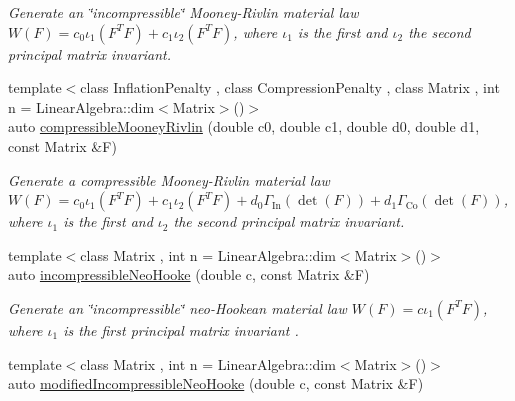 \begin{DoxyCompactItemize}
\begin{DoxyCompactList}\small\item\em Generate an \char`\"{}incompressible\char`\"{} Mooney-\/\-Rivlin material law $ W(F)=c_0\iota_1(F^T F) + c_1\iota_2(F^T F) $, where $\iota_1$ is the first and $\iota_2$ the second principal matrix invariant. \end{DoxyCompactList}\item 
\hypertarget{group__Rubber_ga9a1894daa10a0bdcc620c6c41ecb6f19}{{\footnotesize template$<$class Inflation\-Penalty , class Compression\-Penalty , class Matrix , int n = Linear\-Algebra\-::dim$<$\-Matrix$>$()$>$ }\\auto \hyperlink{group__Rubber_ga9a1894daa10a0bdcc620c6c41ecb6f19}{compressible\-Mooney\-Rivlin} (double c0, double c1, double d0, double d1, const Matrix \&F)}\label{group__Rubber_ga9a1894daa10a0bdcc620c6c41ecb6f19}

\begin{DoxyCompactList}\small\item\em Generate a compressible Mooney-\/\-Rivlin material law $ W(F)=c_0\iota_1(F^T F) + c_1\iota_2(F^T F) + d_0\Gamma_\mathrm{In}(\det(F))+d_1\Gamma_\mathrm{Co}(\det(F)) $, where $\iota_1$ is the first and $\iota_2$ the second principal matrix invariant. \end{DoxyCompactList}\item 
\hypertarget{group__Rubber_ga5bb28aef7006413775791998936d6b81}{{\footnotesize template$<$class Matrix , int n = Linear\-Algebra\-::dim$<$\-Matrix$>$()$>$ }\\auto \hyperlink{group__Rubber_ga5bb28aef7006413775791998936d6b81}{incompressible\-Neo\-Hooke} (double c, const Matrix \&F)}\label{group__Rubber_ga5bb28aef7006413775791998936d6b81}

\begin{DoxyCompactList}\small\item\em Generate an \char`\"{}incompressible\char`\"{} neo-\/\-Hookean material law $ W(F)=c\iota_1(F^T F) $, where $\iota_1$ is the first principal matrix invariant . \end{DoxyCompactList}\item 
\hypertarget{group__Rubber_gaf6f5ab6a379ef03d513acc5042731a01}{{\footnotesize template$<$class Matrix , int n = Linear\-Algebra\-::dim$<$\-Matrix$>$()$>$ }\\auto \hyperlink{group__Rubber_gaf6f5ab6a379ef03d513acc5042731a01}{modified\-Incompressible\-Neo\-Hooke} (double c, const Matrix \&F)}\label{group__Rubber_gaf6f5ab6a379ef03d513acc5042731a01}


\end{DoxyCompactItemize}

